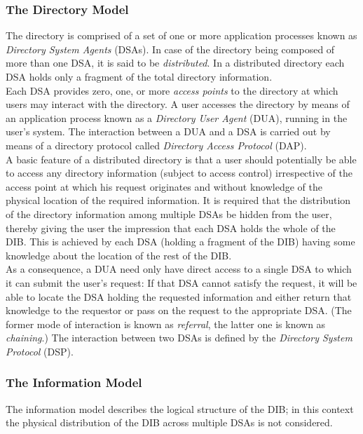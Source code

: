 \subsubsection{The Directory Model}

The directory is comprised of a set of one or more application
processes known as {\em Directory System Agents} (DSAs). In case
of the directory being composed of more than one DSA, it is said to
be {\em distributed}. In a distributed directory each DSA holds
only a fragment of the total directory information.
\\ [1ex]
Each DSA provides zero, one, or more {\em access points} to the directory
at which users may interact with the directory. A user accesses the
directory by means of an application process known as a {\em Directory
User Agent} (DUA), running in the user's system.
The interaction between a DUA and a DSA is carried out by means of a
directory protocol called {\em Directory Access Protocol} (DAP).
\\ [1ex]
A basic feature of a distributed directory is that a user
should potentially be able to access any directory information
(subject to access control) irrespective of the access point at which
his request originates and without knowledge of the physical location
of the required information. It is required that the distribution
of the directory information among multiple DSAs be hidden from the
user, thereby giving the user the impression that each DSA holds
the whole of the DIB. This is achieved by each DSA (holding
a fragment of the DIB) having some knowledge about the location
of the rest of the DIB.
\\ [1ex]
As a consequence, a DUA need only have direct access to a single DSA to
which it can submit the user's request: If that DSA cannot
satisfy the request, it will be able to locate the DSA holding
the requested information and either return that knowledge to the
requestor or pass on the request to the appropriate DSA. (The former
mode of interaction is known as {\em referral}, the latter one
is known as {\em chaining}.) The interaction between two DSAs is
defined by the {\em Directory System Protocol} (DSP).


\subsubsection{The Information Model}

The information model describes the logical structure of the DIB; in
this context the physical distribution of the DIB across multiple DSAs
is not considered.

